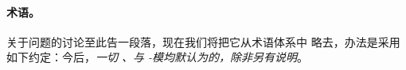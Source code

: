 \paragraph{术语。}\label{sub:terminology}
关于\trIdentityMorphism{}问题的讨论至此告一段落，现在我们将把它从术语体系中%
略去，办法是采用如下约定：今后，\emph{一切 \trACategory、\trAFunctor{}与%
\trAinfty-模均默认为\trCunital{}的，除非另有说明}。
